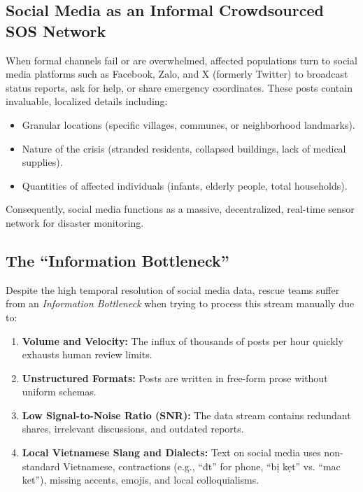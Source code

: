 \documentclass[12pt,a4paper]{article}
\begin{document}
\subsection{Social Media as an Informal Crowdsourced SOS Network}
When formal channels fail or are overwhelmed, affected populations turn to social media platforms such as Facebook, Zalo, and X (formerly Twitter) to broadcast status reports, ask for help, or share emergency coordinates. These posts contain invaluable, localized details including:
\begin{itemize}
    \item Granular locations (specific villages, communes, or neighborhood landmarks).
    \item Nature of the crisis (stranded residents, collapsed buildings, lack of medical supplies).
    \item Quantities of affected individuals (infants, elderly people, total households).
\end{itemize}
Consequently, social media functions as a massive, decentralized, real-time sensor network for disaster monitoring.

\subsection{The ``Information Bottleneck''}
Despite the high temporal resolution of social media data, rescue teams suffer from an \textit{Information Bottleneck} when trying to process this stream manually due to:
\begin{enumerate}
    \item \textbf{Volume and Velocity:} The influx of thousands of posts per hour quickly exhausts human review limits.
    \item \textbf{Unstructured Formats:} Posts are written in free-form prose without uniform schemas.
    \item \textbf{Low Signal-to-Noise Ratio (SNR):} The data stream contains redundant shares, irrelevant discussions, and outdated reports.
    \item \textbf{Local Vietnamese Slang and Dialects:} Text on social media uses non-standard Vietnamese, contractions (e.g., ``đt'' for phone, ``bị kẹt'' vs. ``mac ket''), missing accents, emojis, and local colloquialisms.
\end{enumerate}
\end{document}
